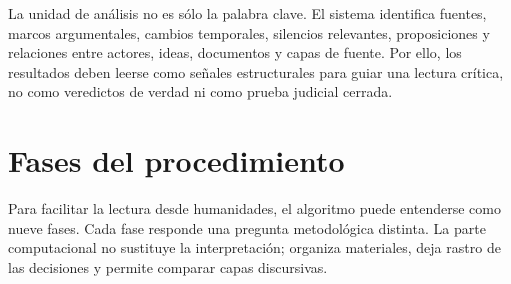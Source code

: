 \documentclass[11pt]{article}
\begin{document}
La unidad de análisis no es sólo la palabra clave. El sistema identifica
fuentes, marcos argumentales, cambios temporales, silencios relevantes,
proposiciones y relaciones entre actores, ideas, documentos y capas de fuente.
Por ello, los resultados deben leerse como señales estructurales para guiar una
lectura crítica, no como veredictos de verdad ni como prueba judicial cerrada.

\section{Fases del procedimiento}

Para facilitar la lectura desde humanidades, el algoritmo puede entenderse como
nueve fases. Cada fase responde una pregunta metodológica distinta. La parte
computacional no sustituye la interpretación; organiza materiales, deja rastro
de las decisiones y permite comparar capas discursivas.
\end{document}
